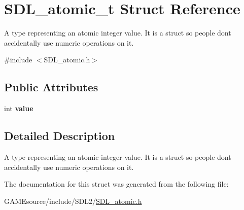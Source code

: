 \hypertarget{struct_s_d_l__atomic__t}{}\section{S\+D\+L\+\_\+atomic\+\_\+t Struct Reference}
\label{struct_s_d_l__atomic__t}


A type representing an atomic integer value. It is a struct so people don\textquotesingle{}t accidentally use numeric operations on it.  




{\ttfamily \#include $<$S\+D\+L\+\_\+atomic.\+h$>$}

\subsection*{Public Attributes}
\begin{DoxyCompactItemize}
\item 
\mbox{\label{struct_s_d_l__atomic__t_a0d09ddf3cc5798c709edb7cea104203a}} 
int {\bfseries value}
\end{DoxyCompactItemize}


\subsection{Detailed Description}
A type representing an atomic integer value. It is a struct so people don\textquotesingle{}t accidentally use numeric operations on it. 

The documentation for this struct was generated from the following file\+:\begin{DoxyCompactItemize}
\item 
G\+A\+M\+Esource/include/\+S\+D\+L2/\mbox{\hyperlink{_s_d_l__atomic_8h}{S\+D\+L\+\_\+atomic.\+h}}\end{DoxyCompactItemize}

